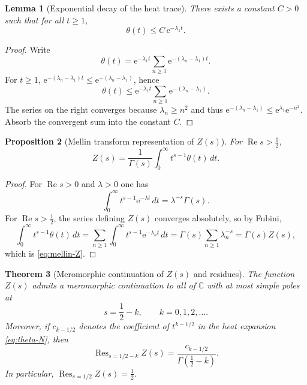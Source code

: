 \documentclass[11pt,letterpaper]{amsart}
\numberwithin{equation}{section}
\newtheorem{theorem}{Theorem}[section]
\newtheorem{lemma}[theorem]{Lemma}
\newtheorem{proposition}[theorem]{Proposition}
\theoremstyle{definition}
\newcommand{\C}{\mathbb{C}}
\newcommand{\Ree}{\operatorname{Re}}
\newcommand{\e}{\mathrm{e}}
\begin{document}
\begin{lemma}[Exponential decay of the heat trace]\label{lem:theta-exp-decay}
There exists a constant $C>0$ such that for all $t\ge 1$,
\[
\theta(t)\le C\,\e^{-\lambda_1 t}.
\]
\end{lemma}

\begin{proof}
Write
\[
\theta(t)=\e^{-\lambda_1 t}\sum_{n\ge 1}\e^{-(\lambda_n-\lambda_1)t}.
\]
For $t\ge 1$, $\e^{-(\lambda_n-\lambda_1)t}\le \e^{-(\lambda_n-\lambda_1)}$, hence
\[
\theta(t)\le \e^{-\lambda_1 t}\sum_{n\ge 1}\e^{-(\lambda_n-\lambda_1)}.
\]
The series on the right converges because $\lambda_n\ge n^2$ and thus
$\e^{-(\lambda_n-\lambda_1)}\le \e^{\lambda_1}\e^{-n^2}$.
Absorb the convergent sum into the constant $C$.
\end{proof}

\begin{proposition}[Mellin transform representation of $Z(s)$]\label{prop:mellin-Z}
For $\Ree s>\tfrac12$,
\begin{equation}\label{eq:mellin-Z}
Z(s)=\frac{1}{\Gamma(s)}\int_0^\infty t^{s-1}\theta(t)\,dt.
\end{equation}
\end{proposition}

\begin{proof}
For $\Ree s>0$ and $\lambda>0$ one has
\[
\int_0^\infty t^{s-1}\e^{-\lambda t}\,dt=\lambda^{-s}\Gamma(s).
\]
For $\Ree s>\tfrac12$, the series defining $Z(s)$ converges absolutely, so by Fubini,
\[
\int_0^\infty t^{s-1}\theta(t)\,dt
=\sum_{n\ge 1}\int_0^\infty t^{s-1}\e^{-\lambda_n t}\,dt
=\Gamma(s)\sum_{n\ge 1}\lambda_n^{-s}=\Gamma(s)Z(s),
\]
which is \eqref{eq:mellin-Z}.
\end{proof}

\begin{theorem}[Meromorphic continuation of $Z(s)$ and residues]\label{thm:Z-meromorphic}
The function $Z(s)$ admits a meromorphic continuation to all of $\C$ with at most simple poles at
\[
s=\frac12-k,\qquad k=0,1,2,\dots.
\]
Moreover, if $c_{k-1/2}$ denotes the coefficient of $t^{k-1/2}$ in the heat expansion \eqref{eq:theta-N},
then
\begin{equation}\label{eq:Z-residue}
\operatorname{Res}_{s=1/2-k} Z(s)=\frac{c_{k-1/2}}{\Gamma(\tfrac12-k)}.
\end{equation}
In particular, $\operatorname{Res}_{s=1/2}Z(s)=\tfrac12$.
\end{theorem}
\end{document}
